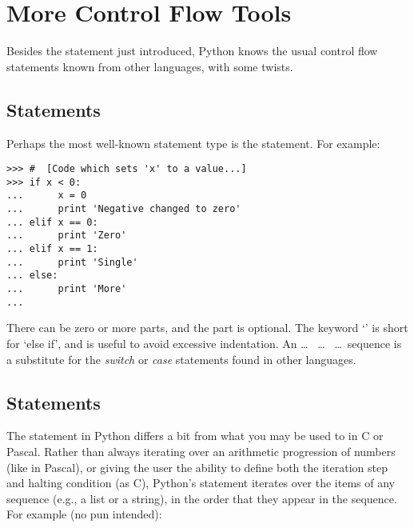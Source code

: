 \documentclass{manual}
\begin{document}
\chapter{More Control Flow Tools \label{moreControl}}

Besides the  statement just introduced, Python knows
the usual control flow statements known from other languages, with
some twists.

\section{ Statements \label{if}}

Perhaps the most well-known statement type is the 
statement.  For example:

\begin{verbatim}
>>> #  [Code which sets 'x' to a value...]
>>> if x < 0:
...      x = 0
...      print 'Negative changed to zero'
... elif x == 0:
...      print 'Zero'
... elif x == 1:
...      print 'Single'
... else:
...      print 'More'
... 
\end{verbatim}

There can be zero or more  parts, and the 
part is optional.  The keyword `' is short for `else
if', and is useful to avoid excessive indentation.  An
 \ldots\  \ldots\ 
\ldots\ sequence is a substitute for the  \emph{switch} or
\emph{case} statements found in other languages.


\section{ Statements \label{for}}

The  statement in Python differs a bit from
what you may be used to in C or Pascal.  Rather than always
iterating over an arithmetic progression of numbers (like in Pascal),
or giving the user the ability to define both the iteration step and
halting condition (as C), Python's 
statement iterates over the items of any sequence (e.g., a list or a
string), in the order that they appear in the sequence.  For example
(no pun intended):
\end{document}
